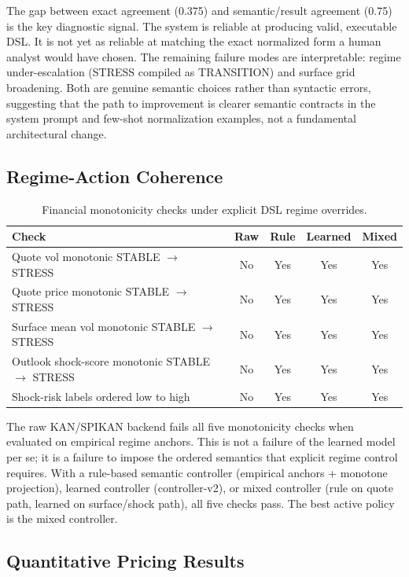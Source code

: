 \documentclass[11pt,a4paper]{article}
\begin{document}
The gap between exact agreement (0.375) and semantic/result agreement (0.75) is the key diagnostic signal. The system is reliable at producing valid, executable DSL. It is not yet as reliable at matching the exact normalized form a human analyst would have chosen. The remaining failure modes are interpretable: regime under-escalation (STRESS compiled as TRANSITION) and surface grid broadening. Both are genuine semantic choices rather than syntactic errors, suggesting that the path to improvement is clearer semantic contracts in the system prompt and few-shot normalization examples, not a fundamental architectural change.

\subsection{Regime-Action Coherence}

\begin{table}[h]
\centering
\caption{Financial monotonicity checks under explicit DSL regime overrides.}
\begin{tabular}{@{}lcccc@{}}
\toprule
Check & Raw & Rule & Learned & Mixed \\ \midrule
Quote vol monotonic STABLE $\to$ STRESS & No & Yes & Yes & Yes \\
Quote price monotonic STABLE $\to$ STRESS & No & Yes & Yes & Yes \\
Surface mean vol monotonic STABLE $\to$ STRESS & No & Yes & Yes & Yes \\
Outlook shock-score monotonic STABLE $\to$ STRESS & No & Yes & Yes & Yes \\
Shock-risk labels ordered low to high & No & Yes & Yes & Yes \\ \bottomrule
\end{tabular}
\label{tab:regime_coherence}
\end{table}

The raw KAN/SPIKAN backend fails all five monotonicity checks when evaluated on empirical regime anchors. This is not a failure of the learned model per se; it is a failure to impose the ordered semantics that explicit regime control requires. With a rule-based semantic controller (empirical anchors + monotone projection), learned controller (controller-v2), or mixed controller (rule on quote path, learned on surface/shock path), all five checks pass. The best active policy is the mixed controller.

\subsection{Quantitative Pricing Results}
\end{document}
